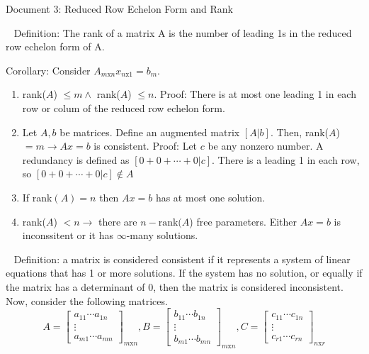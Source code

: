\documentclass[12pt]{article}
\begin{document}
\begin{center}
Document 3: Reduced Row Echelon Form and Rank
\end{center}

\setlength{\leftskip}{0 in}
$\,\,\,$ Definition: The rank of a matrix A is the number of leading 1s in the reduced row echelon form of A.

Corollary: Consider $A_{m\text{x}n}x_{n\text{x}1}=b_m$.
\begin{enumerate}
\item rank($A$) $\leq m \land$ rank($A$) $\leq n$. Proof: There is at most one leading 1 in each row or colum of the reduced row echelon form.
\item Let $A,b$ be matrices. Define an augmented matrix $\left[\left.A\right|b\right]$. Then, rank($A$)$=m\rightarrow Ax=b$ is consistent. Proof: Let $c$ be any nonzero number. A redundancy is defined as $\left[\left.0+0+\cdots+0\right| c\right]$. There is a leading 1 in each row, so $\left[\left.0+0+\cdots+0\right| c\right]\not\in A$
\item If rank$(A)=n$ then $Ax=b$ has at most one solution.
\item rank($A$) $<n\rightarrow$ there are $n-\text{rank(}A$) free parameters. Either $Ax=b$ is inconssitent or it has $\infty$-many solutions.
\end{enumerate}

$\,\,\,$ Definition: a matrix is considered consistent if it represents a system of linear equations that has 1 or more solutions. If the system has no solution, or equally if the matrix has a determinant of 0, then the matrix is considered inconsistent. Now, consider the following matrices.
$$A=\left[ \begin{matrix}
a_{11}\cdots a_{1n}\\
\vdots\\
a_{m1}\cdots a_{mn}
\end{matrix}\right] _{m\text{x}n},
B=\left[ \begin{matrix}
b_{11}\cdots b_{1n}\\
\vdots\\
b_{m1}\cdots b_{mn}
\end{matrix}\right] _{m\text{x}n},
C=\left[ \begin{matrix}
c_{11}\cdots c_{1n}\\
\vdots\\
c_{r1}\cdots c_{rn}
\end{matrix}\right] _{n\text{x}r}$$
\end{document}
